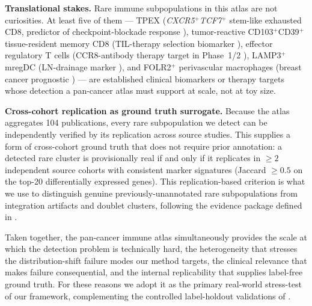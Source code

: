 \textbf{Translational stakes.} Rare immune subpopulations in this
atlas are not curiosities. At least five of them --- TPEX
(\textit{CXCR5$^+$TCF7$^+$} stem-like exhausted CD8, predictor of
checkpoint-blockade response \citep{miller2019subsets,
jansen2019expansion}), tumor-reactive CD103$^+$CD39$^+$ tissue-resident
memory CD8 (TIL-therapy selection biomarker
\citep{duhen2018coexpression, caushi2021transcriptional}), effector
regulatory T cells (CCR8-antibody therapy target in Phase~1/2
\citep{desimone2016ttregsig, plitas2016regulatory, vandamme2021depletion}),
LAMP3$^+$ mregDC (LN-drainage marker \citep{maier2020conserved}), and
FOLR2$^+$ perivascular macrophages (breast cancer prognostic
\citep{nalioramos2022tissue}) --- are established clinical biomarkers
or therapy targets whose detection a pan-cancer atlas must support
at scale, not at toy size.

\textbf{Cross-cohort replication as ground truth surrogate.} Because
the atlas aggregates 104 publications, every rare subpopulation we
detect can be independently verified by its replication across
source studies. This supplies a form of cross-cohort ground truth
that does not require prior annotation: a detected rare cluster is
provisionally real if and only if it replicates in $\geq 2$
independent source cohorts with consistent marker signatures
(Jaccard $\geq 0.5$ on the top-20 differentially expressed genes).
This replication-based criterion is what we use to distinguish
genuine previously-unannotated rare subpopulations from integration
artifacts and doublet clusters, following the evidence package
defined in .

Taken together, the pan-cancer immune atlas simultaneously provides
the scale at which the detection problem is technically hard, the
heterogeneity that stresses the distribution-shift failure modes
our method targets, the clinical relevance that makes failure
consequential, and the internal replicability that supplies
label-free ground truth. For these reasons we adopt it as the
primary real-world stress-test of our framework, complementing the
controlled label-holdout validations of
.

